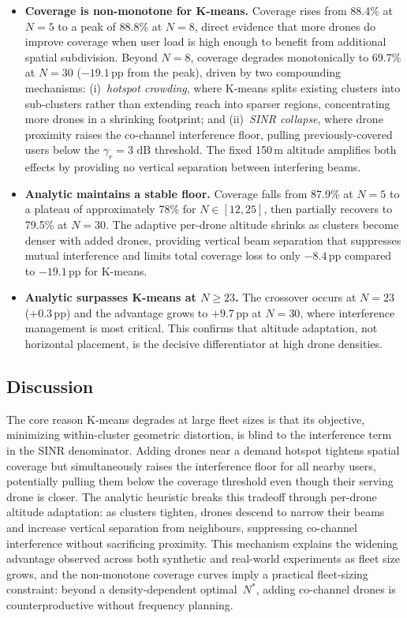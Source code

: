 \documentclass[conference]{IEEEtran}
\newcommand{\dB}{\,\mathrm{dB}}
\begin{document}
\begin{itemize}
    \item \textbf{Coverage is non-monotone for K-means.} Coverage rises from 88.4\% at $N{=}5$ to a peak of 88.8\% at $N{=}8$, direct evidence that more drones do improve coverage when user load is high enough to benefit from additional spatial subdivision. Beyond $N{=}8$, coverage degrades monotonically to 69.7\% at $N{=}30$ ($-19.1$\,pp from the peak), driven by two compounding mechanisms: (i)~\emph{hotspot crowding}, where K-means splits existing clusters into sub-clusters rather than extending reach into sparser regions, concentrating more drones in a shrinking footprint; and (ii)~\emph{SINR collapse}, where drone proximity raises the co-channel interference floor, pulling previously-covered users below the $\gamma_r = 3\,\dB$ threshold. The fixed 150\,m altitude amplifies both effects by providing no vertical separation between interfering beams.
    \item \textbf{Analytic maintains a stable floor.} Coverage falls from 87.9\% at $N{=}5$ to a plateau of approximately 78\% for $N \in [12, 25]$, then partially recovers to 79.5\% at $N{=}30$. The adaptive per-drone altitude shrinks as clusters become denser with added drones, providing vertical beam separation that suppresses mutual interference and limits total coverage loss to only $-8.4$\,pp compared to $-19.1$\,pp for K-means.
    \item \textbf{Analytic surpasses K-means at $N \geq 23$.} The crossover occurs at $N{=}23$ (+0.3\,pp) and the advantage grows to $+9.7$\,pp at $N{=}30$, where interference management is most critical. This confirms that altitude adaptation, not horizontal placement, is the decisive differentiator at high drone densities.
\end{itemize}

\subsection{Discussion}
\label{sec:discussion}

The core reason K-means degrades at large fleet sizes is that its objective, minimizing within-cluster geometric distortion, is blind to the interference term in the SINR denominator. Adding drones near a demand hotspot tightens spatial coverage but simultaneously raises the interference floor for all nearby users, potentially pulling them below the coverage threshold even though their serving drone is closer. The analytic heuristic breaks this tradeoff through per-drone altitude adaptation: as clusters tighten, drones descend to narrow their beams and increase vertical separation from neighbours, suppressing co-channel interference without sacrificing proximity. This mechanism explains the widening advantage observed across both synthetic and real-world experiments as fleet size grows, and the non-monotone coverage curves imply a practical fleet-sizing constraint: beyond a density-dependent optimal~$N^*$, adding co-channel drones is counterproductive without frequency planning.
\end{document}
